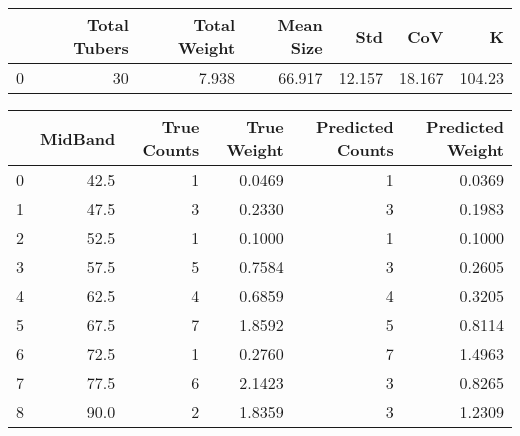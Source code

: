 \begin{tabular}{lrrrrrr}
\toprule
{} &  Total Tubers &  Total Weight &  Mean Size &     Std &     CoV &       K \\
\midrule
0 &            30 &         7.938 &     66.917 &  12.157 &  18.167 &  104.23 \\
\bottomrule
\end{tabular}

\begin{tabular}{lrrrrr}
\toprule
{} &  MidBand &  True Counts &  True Weight &  Predicted Counts &  Predicted Weight \\
\midrule
0 &     42.5 &            1 &       0.0469 &                 1 &            0.0369 \\
1 &     47.5 &            3 &       0.2330 &                 3 &            0.1983 \\
2 &     52.5 &            1 &       0.1000 &                 1 &            0.1000 \\
3 &     57.5 &            5 &       0.7584 &                 3 &            0.2605 \\
4 &     62.5 &            4 &       0.6859 &                 4 &            0.3205 \\
5 &     67.5 &            7 &       1.8592 &                 5 &            0.8114 \\
6 &     72.5 &            1 &       0.2760 &                 7 &            1.4963 \\
7 &     77.5 &            6 &       2.1423 &                 3 &            0.8265 \\
8 &     90.0 &            2 &       1.8359 &                 3 &            1.2309 \\
\bottomrule
\end{tabular}

